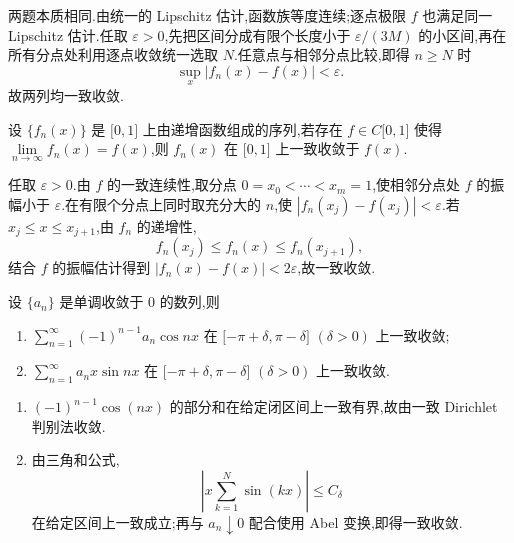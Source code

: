 \begin{solution}
    两题本质相同.由统一的 Lipschitz 估计,函数族等度连续;逐点极限 $f$ 也满足同一 Lipschitz 估计.任取 $\varepsilon>0$,先把区间分成有限个长度小于 $\varepsilon/(3M)$ 的小区间,再在所有分点处利用逐点收敛统一选取 $N$.任意点与相邻分点比较,即得 $n\geq N$ 时
    \[
        \sup_x|f_n(x)-f(x)|<\varepsilon.
    \]
    故两列均一致收敛.
\end{solution}

\begin{example}
    设 $\{f_n(x)\}$ 是 $\lbrack 0,1\rbrack$ 上由递增函数组成的序列,若存在 $f\in C\lbrack 0,1\rbrack$ 使得 $\displaystyle\lim\limits_{n\to\infty}f_n(x)=f(x)$,则 $f_n(x)$ 在 $\lbrack 0,1\rbrack$ 上一致收敛于 $f(x)$.
\end{example}
\exampleblank

\begin{solution}
    任取 $\varepsilon>0$.由 $f$ 的一致连续性,取分点
    $0=x_0<\cdots<x_m=1$,使相邻分点处 $f$ 的振幅小于 $\varepsilon$.在有限个分点上同时取充分大的 $n$,使
    $|f_n(x_j)-f(x_j)|<\varepsilon$.若 $x_j\leq x\leq x_{j+1}$,由
    $f_n$ 的递增性,
    \[
        f_n(x_j)\leq f_n(x)\leq f_n(x_{j+1}),
    \]
    结合 $f$ 的振幅估计得到 $|f_n(x)-f(x)|<2\varepsilon$,故一致收敛.
\end{solution}

\begin{example}
    设 $\{a_n\}$ 是单调收敛于 $0$ 的数列,则
    \begin{enumerate}
        \item $\displaystyle\sum\limits_{n=1}^{\infty}(-1)^{n-1}a_n\cos nx$ 在 $\lbrack -\pi+\delta,\pi-\delta\rbrack$ $(\delta>0)$ 上一致收敛;
        \item $\displaystyle\sum\limits_{n=1}^{\infty}a_nx\sin nx$ 在 $\lbrack -\pi+\delta,\pi-\delta\rbrack$ $(\delta>0)$ 上一致收敛.
    \end{enumerate}
\end{example}
\exampleblank

\begin{solution}
    \begin{enumerate}
        \item $(-1)^{n-1}\cos(nx)$ 的部分和在给定闭区间上一致有界,故由一致 Dirichlet 判别法收敛.
        \item 由三角和公式,
              \[
                  \left|x\sum\limits_{k=1}^{N}\sin(kx)\right|
                  \leq C_\delta
              \]
              在给定区间上一致成立;再与 $a_n\downarrow0$ 配合使用 Abel 变换,即得一致收敛.
    \end{enumerate}
\end{solution}


